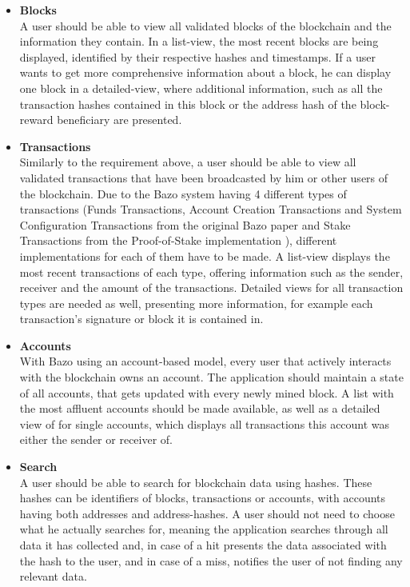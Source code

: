 \begin{itemize}
\item \textbf{Blocks}\\
A user should be able to view all validated blocks of the blockchain and the information they contain. In a list-view, the most recent blocks are being displayed, identified by their respective hashes and timestamps. If a user wants to get more comprehensive information about a block, he can display one block in a detailed-view, where additional information, such as all the transaction hashes contained in this block or the address hash of the block-reward beneficiary are presented.
\item \textbf{Transactions}\\
Similarly to the requirement above, a user should be able to view all validated transactions that have been broadcasted by him or other users of the blockchain. Due to the Bazo system having 4 different types of transactions (Funds Transactions, Account Creation Transactions and System Configuration Transactions from the original Bazo paper \cite{bazo} and Stake Transactions from the Proof-of-Stake implementation \cite{pos}), different implementations for each of them have to be made. A list-view displays the most recent transactions of each type, offering information such as the sender, receiver and the amount of the transactions. Detailed views for all transaction types are needed as well, presenting more information, for example each transaction's signature or block it is contained in.
\item \textbf{Accounts}\\
With Bazo using an account-based model, every user that actively interacts with the blockchain owns an account. The application should maintain a state of all accounts, that gets updated with every newly mined block. A list with the most affluent accounts should be made available, as well as a detailed view of for single accounts, which displays all transactions this account was either the sender or receiver of.
\item \textbf{Search}\\
A user should be able to search for blockchain data using hashes. These hashes can be identifiers of blocks, transactions or accounts, with accounts having both addresses and address-hashes. A user should not need to choose what he actually searches for, meaning the application searches through all data it has collected and, in case of a hit presents the data associated with the hash to the user, and in case of a miss, notifies the user of not finding any relevant data.

\end{itemize}
